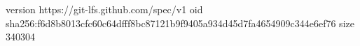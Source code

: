 version https://git-lfs.github.com/spec/v1
oid sha256:f6d8b8013cfc60c64dfff8bc87121b9f9405a934d45d7fa4654909c344e6ef76
size 340304
